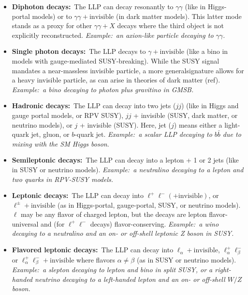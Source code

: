 
\begin{itemize}
\item {\bf Diphoton decays:}~The LLP can decay resonantly to
  $\gamma\gamma$ (like in Higgs-portal models) or to
  $\gamma\gamma+\mathrm{invisible}$ (in dark matter models). This
  latter mode stands as a proxy for other $\gamma\gamma+X$ decays
  where the third object is not explicitly reconstructed. \emph{Example:~an
  axion-like particle decaying to $\gamma\gamma$.}

\item {\bf Single photon decays:}~The LLP decays to
  $\gamma+\mathrm{invisible}$ (like a bino in models with
  gauge-mediated SUSY-breaking).  While the SUSY signal mandates a
  near-massless invisible particle, a more generalsignature allows for
  a heavy invisible particle, as can arise in theories of dark matter
  (ref). \emph{Example:~a bino decaying to photon plus gravitino in GMSB.}

\item {\bf Hadronic decays:}~The LLP can decay into two jets ($jj$)
  (like in Higgs and gauge portal models, or RPV SUSY), $jj$ +
  invisible (SUSY, dark matter, or neutrino models), or $j$ +
  invisible (SUSY). Here, jet ($j$) means either a light-quark jet,
  gluon, or $b$-quark jet. \emph{Example:~a scalar LLP decaying to $b\bar{b}$
  due to mixing with the SM Higgs boson}. 

\item {\bf Semileptonic decays:}~The LLP can decay into a lepton + 1
  or 2 jets (like in SUSY or neutrino models). \emph{Example:~a neutralino decaying
  to a lepton and two quarks in RPV-SUSY models.}

\item {\bf Leptonic decays:}~The LLP can decay into
  $\ell^+\ell^-(+\mathrm{invisible})$, or
  $\ell^\pm+\mathrm{invisible}$ (as in Higgs-portal, gauge-portal,
  SUSY, or neutrino models). $\ell$ may be any flavor of charged
  lepton, but the decays are lepton flavor-universal and (for
  $\ell^+\ell^-$ decays) flavor-conserving. \emph{Example:~a wino decaying
  to a neutralino and an on- or off-shell leptonic Z boson in SUSY.}

\item {\bf Flavored leptonic decays:}~The LLP can decay into
  $\ell_\alpha+\mathrm{invisible}$, $\ell_\alpha^+\ell_\beta^-$ or
  $\ell_\alpha^+\ell_\beta^-+\mathrm{invisible}$ where flavors
  $\alpha\neq\beta$ (as in SUSY or neutrino models). \emph{Example:~a slepton decaying to lepton and bino in split SUSY, or a right-handed neutrino decaying to a left-handed lepton and an on- or off-shell $W/Z$ boson.}
\end{itemize}

